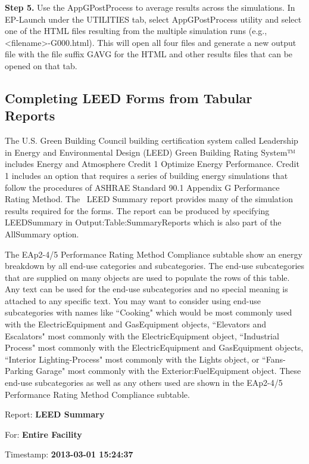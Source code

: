 \textbf{Step 5.} Use the AppGPostProcess to average results across the simulations. In EP-Launch under the UTILITIES tab, select AppGPostProcess utility and select one of the HTML files resulting from the multiple simulation runs (e.g., \textless{}filename\textgreater{}-G000.html). This will open all four files and generate a new output file with the file suffix GAVG for the HTML and other results files that can be opened on that tab.

\subsection{Completing LEED Forms from Tabular Reports}\label{completing-leed-forms-from-tabular-reports}

The U.S. Green Building Council building certification system called Leadership in Energy and Environmental Design (LEED) Green Building Rating System™ includes Energy and Atmosphere Credit 1 Optimize Energy Performance. Credit 1 includes an option that requires a series of building energy simulations that follow the procedures of ASHRAE Standard 90.1 Appendix G Performance Rating Method. The~ LEED Summary report provides many of the simulation results required for the forms. The report can be produced by specifying LEEDSummary in Output:Table:SummaryReports which is also part of the AllSummary option. 

The EAp2-4/5 Performance Rating Method Compliance subtable show an energy breakdown by all end-use categories and subcategories. The end-use subcategories that are supplied on many objects are used to populate the rows of this table. Any text can be used for the end-use subcategories and no special meaning is attached to any specific text. You may want to consider using end-use subcategories with names like ``Cooking" which would be most commonly used with the ElectricEquipment and GasEquipment objects, ``Elevators and Escalators" most commonly with the ElectricEquipment object, ``Industrial Process" most commonly with the ElectricEquipment and GasEquipment objects, ``Interior Lighting-Process" most commonly with the Lights object, or ``Fans-Parking Garage" most commonly with the Exterior:FuelEquipment object. These end-use subcategories as well as any others used are shown in the EAp2-4/5 Performance Rating Method Compliance subtable.

Report: \textbf{LEED Summary}

For: \textbf{Entire Facility}

Timestamp: \textbf{2013-03-01 15:24:37}

